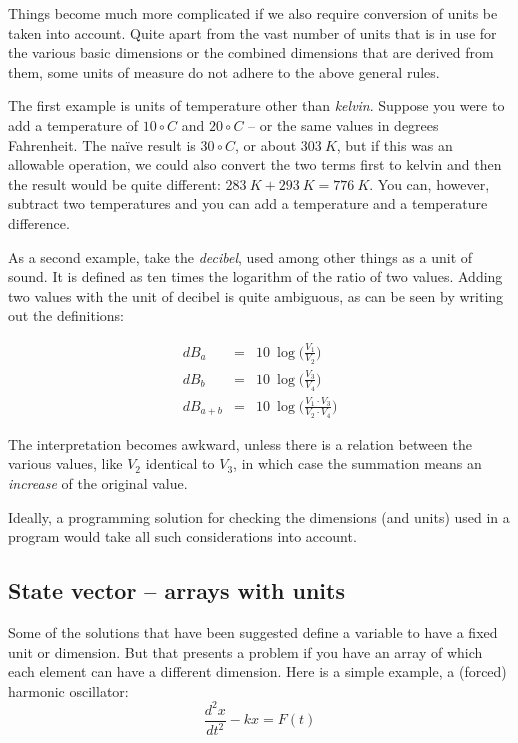 \documentclass{article}
\begin{document}
Things become much more complicated if we also require conversion of units be taken into account. Quite apart from
the vast number of units that is in use for the various basic dimensions or the combined dimensions that are derived
from them, some units of measure do not adhere to the above general rules.

The first example is units of temperature other than \emph{kelvin}. Suppose you were to add a temperature of $10 \circ C$
and $20 \circ C$ -- or the same values in degrees Fahrenheit. The na\"ive result is $30 \circ C$, or about $303~K$, but if this was an
allowable operation, we could also convert the two terms first to kelvin and then the result would be quite different:
$ 283~K + 293~K = 776~K$. You can, however, subtract two temperatures and you can add a temperature and a temperature difference.

As a second example, take the \emph{decibel}, used among other things as a unit of sound. It is defined as ten times the
logarithm of the ratio of two values. Adding two values with the unit of decibel is quite ambiguous, as can be seen
by writing out the definitions:

\begin{eqnarray}
   dB_{a}   &=& 10 ~ \log \bigl ( \frac{V_1}{V_2} \bigr ) \\
   dB_{b}   &=& 10 ~ \log \bigl ( \frac{V_3}{V_4} \bigr ) \\
   dB_{a+b} &=& 10 ~ \log \bigl ( \frac{V_1 \cdot V_3}{V_2 \cdot V_4} \bigr )
\end{eqnarray}

The interpretation becomes awkward, unless there is a relation between the various values, like $V_2$ identical to $V_3$, in
which case the summation means an \emph{increase} of the original value.

Ideally, a programming solution for checking the dimensions (and units) used in a program would take all such considerations
into account.

\subsection*{State vector -- arrays with units}
Some of the solutions that have been suggested define a variable to have a fixed unit or dimension. But that presents
a problem if you have an array of which each element can have a different dimension. Here is a simple example,
a (forced) harmonic oscillator:
\begin{equation}
    \frac{d^2 x}{dt^2} - kx = F(t)
\end{equation}
\end{document}
